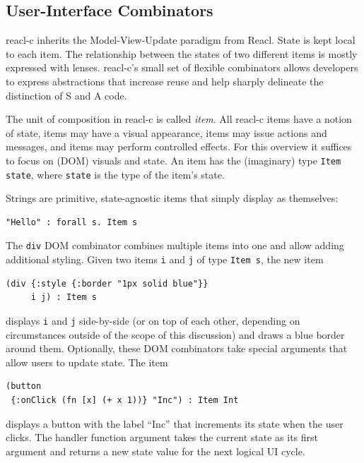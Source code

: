 \documentclass[sigplan,review,screen]{acmart}
\begin{document}
\subsection{User-Interface Combinators}

reacl-c inherits the Model-View-Update paradigm from Reacl.  State is kept local to each item. The relationship between
the states of two different items is mostly expressed with lenses.  reacl-c's small
set of flexible combinators allows developers to express abstractions
that increase reuse and help sharply delineate the distinction of S
and A code.

The unit of
composition in reacl-c is called \textit{item}. All reacl-c items have
a notion of state, items may have a visual appearance, items may issue
actions and messages, and items may perform controlled effects.  For
this overview it suffices to focus on (DOM) visuals and state.
An item has the (imaginary) type \texttt{Item
  state}, where \texttt{state} is the type of the item's state.

Strings are primitive, state-agnostic items that simply display as
themselves:
%
\begin{verbatim}
"Hello" : forall s. Item s
\end{verbatim}
%
The \texttt{div} DOM combinator combines multiple items into
one and allow adding additional styling. Given two items \texttt{i}
and \texttt{j} of type \texttt{Item s}, the new item
%
\begin{verbatim}
(div {:style {:border "1px solid blue"}}
     i j) : Item s
\end{verbatim}
%
displays \texttt{i} and \texttt{j}
side-by-side (or on top of each other, depending on circumstances
outside of the scope of this discussion) and draws a blue
border around them. Optionally, these DOM combinators take special
arguments that allow users to update state. The item
%
\begin{verbatim}
(button
 {:onClick (fn [x] (+ x 1))} "Inc") : Item Int
\end{verbatim}
%
displays a button with the label ``Inc'' that increments its state
when the user clicks. The handler function argument takes the current state as its
first argument and returns a new state value for the next logical UI
cycle.
\end{document}

